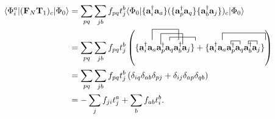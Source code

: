 \documentclass[a4paper,norsk,11pt,twoside]{report}
\begin{document}
\begin{align}
\langle \Phi_i^a | (\textbf{F}_N \textbf{T}_1)_c | \Phi_0 \rangle  & = 
\sum_{pq} \sum_{jb} f_{pq} t_j^b \langle \Phi_0 | 
\{ \textbf{a}^{\dag}_i \textbf{a}_a \} (\{ \textbf{a}^{\dag}_p \textbf{a}_q \} \{
\textbf{a}^{\dag}_b \textbf{a}_j \})_c | \Phi_0 \rangle \nonumber \\ &
= \sum_{pq} \sum_{jb} f_{pq} t_j^b \left(
\{
\contraction{\textbf{a}^{\dag}_i
\textbf{a}_a}{\textbf{a}^{\dag}_p}{\textbf{a}_q
\textbf{a}^{\dag}_b}{\textbf{a}_j}
\contraction[3ex]{}{\textbf{a}^{\dag}_i}{\textbf{a}_a
\textbf{a}^{\dag}_p}{\textbf{a}_q}
\contraction[3ex]{\textbf{a}^{\dag}_i}{\textbf{a}_a}{\textbf{a}_q}{\textbf{a}^{\dag}_p \textbf{a}^{\dag}_b}
\textbf{a}^{\dag}_i
\textbf{a}_a
\textbf{a}^{\dag}_p
\textbf{a}_q
\textbf{a}^{\dag}_b
\textbf{a}_j
\}
+
\{
\contraction[2ex]{}{\textbf{a}^{\dag}_i}{\textbf{a}_a
\textbf{a}^{\dag}_p
\textbf{a}_q
\textbf{a}^{\dag}_b}{\textbf{a}_j}
\contraction{\textbf{a}^{\dag}_i}{\textbf{a}_a}{}{\textbf{a}^{\dag}_p}
\contraction{\textbf{a}^{\dag}_i
\textbf{a}_a
\textbf{a}^{\dag}_p}{\textbf{a}_q}{}{\textbf{a}^{\dag}_b}
\textbf{a}^{\dag}_i
\textbf{a}_a
\textbf{a}^{\dag}_p
\textbf{a}_q
\textbf{a}^{\dag}_b
\textbf{a}_j
\} \right) \nonumber \\ &
= \sum_{pq} \sum_{jb} f_{pq} t_j^b \left(
\delta_{iq} \delta_{ab} \delta_{pj} + 
\delta_{ij} \delta_{ap} \delta_{qb} \right) \nonumber \\ &
= - \sum_j f_{ji} t_j^a + \sum_b f_{ab} t_i^b
.
\end{align}
\end{document}
